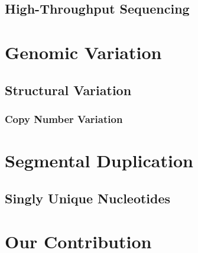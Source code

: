 \subsection{High-Throughput Sequencing}
\section{Genomic Variation}
\subsection{Structural Variation}
\subsubsection{Copy Number Variation}
\section{Segmental Duplication}
\subsection{Singly Unique Nucleotides}
\section{Our Contribution}
\newpage
